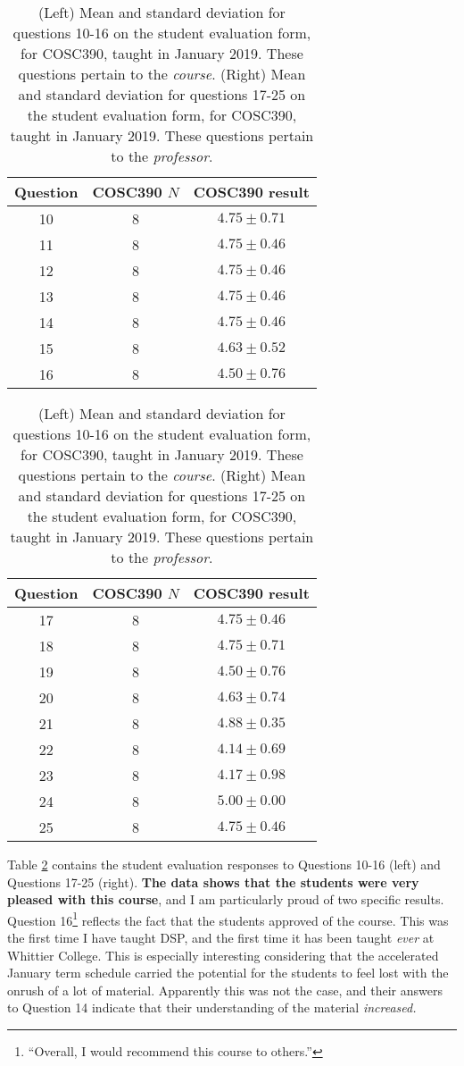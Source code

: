 \documentclass[../../main.tex]{subfiles}
\begin{document}
\label{sec:oof2}

\begin{table}
\small
\centering
\begin{tabular}{| c | c | c |}
\hline \hline
Question & COSC390 $N$ & COSC390 result \\ \hline
10 & 8 & $4.75\pm 0.71$ \\ \hline
11 & 8 & $4.75\pm 0.46$ \\ \hline
12 & 8 & $4.75\pm 0.46$ \\ \hline
13 & 8 & $4.75\pm 0.46$ \\ \hline
14 & 8 & $4.75\pm 0.46$ \\ \hline
15 & 8 & $4.63\pm 0.52$ \\ \hline
16 & 8 & $4.50\pm 0.76$ \\ \hline
\hline
\end{tabular}
\quad
\begin{tabular}{| c | c | c |}
\hline \hline
Question & COSC390 $N$ & COSC390 result \\ \hline
17 & 8 & $4.75\pm 0.46$ \\ \hline
18 & 8 & $4.75\pm 0.71$ \\ \hline
19 & 8 & $4.50\pm 0.76$ \\ \hline
20 & 8 & $4.63\pm 0.74$ \\ \hline
21 & 8 & $4.88\pm 0.35$ \\ \hline
22 & 8 & $4.14\pm 0.69$ \\ \hline
23 & 8 & $4.17\pm 0.98$ \\ \hline
24 & 8 & $5.00\pm 0.00$ \\ \hline
25 & 8 & $4.75\pm 0.46$ \\ \hline
\hline
\end{tabular}
\caption{\label{tab:courses:adv_eval_3} (Left) Mean and standard deviation for questions 10-16 on the student evaluation form, for COSC390, taught in January 2019.  These questions pertain to the \textit{course}.  (Right) Mean and standard deviation for questions 17-25 on the student evaluation form, for COSC390, taught in January 2019.  These questions pertain to the \textit{professor}.}
\end{table}

Table \ref{tab:courses:adv_eval_3} contains the student evaluation responses to Questions 10-16 (left) and Questions 17-25 (right).  \textbf{The data shows that the students were very pleased with this course}, and I am particularly proud of two specific results.  Question 16\footnote{``Overall, I would recommend this course to others.''} reflects the fact that the students approved of the course.  This was the first time I have taught DSP, and the first time it has been taught \textit{ever} at Whittier College.  This is especially interesting considering that the accelerated January term schedule carried the potential for the students to feel lost with the onrush of a lot of material.  Apparently this was not the case, and their answers to Question 14 indicate that their understanding of the material \textit{increased.} \\ \hspace{0.1cm}
\end{document}
